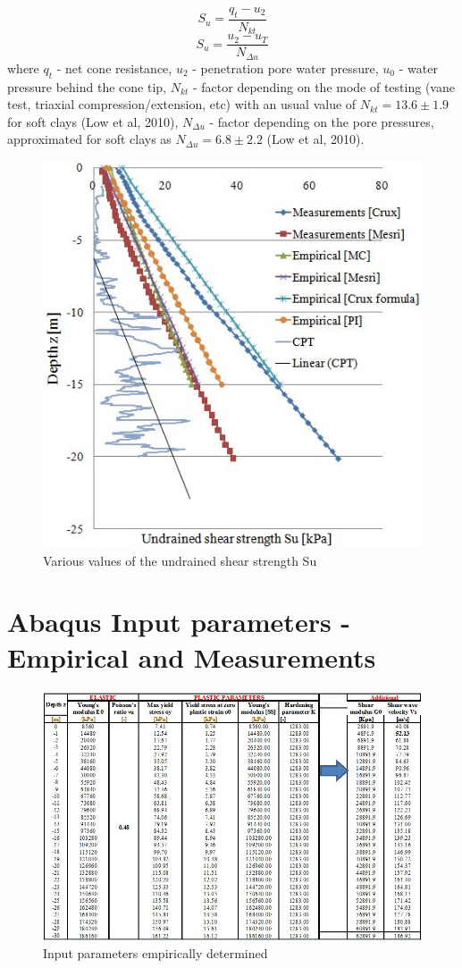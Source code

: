 \documentclass[11pt,a4paper]{report}
\begin{document}
\begin{enumerate}
\begin{equation}
S_u=\frac{q_t-u_2}{N_{kt}}
\end{equation}
\begin{equation}
S_u=\frac{u_2-u_T}{N_{\Delta u}}
\end{equation}
where $q_t$ - net cone resistance, $u_2$ - penetration pore water pressure, $u_0$ - water pressure behind the cone tip, $N_{kt}$ - factor depending on the mode of testing (vane test, triaxial compression/extension, etc) with an usual value of $N_{kt}=13.6\pm1.9$ for soft clays (Low et al, 2010), $N_{\Delta u}$ - factor depending on the pore pressures, approximated for soft clays as $N_{\Delta u}=6.8\pm2.2$ (Low et al, 2010).
\end{enumerate}
\begin{figure}[h!]
	\centering
	\includegraphics[width=0.45\linewidth]{"Su"}
	\caption{Various values of the undrained shear strength Su}
	\label{Su_2}
\end{figure}
	
\newpage
\chapter{Abaqus Input parameters - Empirical and Measurements} \label{App:AppendixF}

\begin{figure}[h!]
	\centering
	\includegraphics[width=1\linewidth]{"empirical"}
	\caption{Input parameters empirically determined}
	\label{empirical}
\end{figure}
\end{document}
